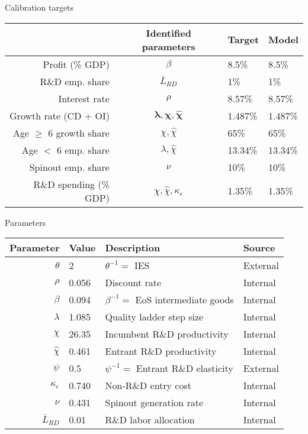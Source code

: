 \documentclass[english,usenames,dvipsnames]{beamer}
\begin{document}
\begin{frame}{Calibration targets}\label{calibration_targets}
\begin{table}[]
	\centering
	\small
	\begin{tabular}{rcll}
		\toprule \toprule
		& Identified parameters & Target & Model \tabularnewline
		\midrule
		Profit (\% GDP) & $\beta$ & 8.5\% & 8.5\% 
		\tabularnewline
		R\&D emp. share & $\bar{L}_{RD}$ & 1\% & 1\% 
		\tabularnewline
		Interest rate & $\rho$ & 8.57\% & 8.57\% 
		\tabularnewline
		Growth rate (CD + OI) & $\mathbf{\lambda, \chi, \hat{\chi}}$ & 1.487\% & 1.487\%
		\tabularnewline		
		Age $\ge$ 6 growth share & $\chi, \hat{\chi}$  & 65\% & 65\%
		\tabularnewline
		Age $<$ 6 emp. share  & $\lambda, \hat{\chi}$ & 13.34\% & 13.34\%
		\tabularnewline
		Spinout emp. share &$\nu$  & 10\% & 10\%
		\tabularnewline
		R\&D spending (\% GDP) & $\chi, \hat{\chi}, \kappa_e$  & 1.35\% & 1.35\%
		\tabularnewline
		\bottomrule
	\end{tabular}
\end{table}
\end{frame}


\begin{frame}{Parameters}\label{parameters}
\begin{table}[]
	\footnotesize
	\centering
	\label{calibration_parameters}
	\begin{tabular}{rlll}
		\toprule \toprule
		Parameter & Value & Description & Source \tabularnewline
		\midrule
		$\theta$ & 2 & $\theta^{-1} = $ IES & External
		\tabularnewline
		$\rho$ & 0.056 & Discount rate  & Internal \tabularnewline
		$\beta$ & 0.094 & $\beta^{-1} = $ EoS intermediate goods & Internal \tabularnewline 
		$\lambda$ & 1.085 & Quality ladder step size & Internal
		\tabularnewline
		$\chi$ & 26.35 & Incumbent R\&D productivity & Internal
		\tabularnewline
		$\hat{\chi}$ & 0.461 & Entrant R\&D productivity & Internal \tabularnewline 
		$\psi$ & 0.5 & $\psi^{-1} = $ Entrant R\&D elasticity & External \tabularnewline
		$\kappa_e$ & 0.740 & Non-R\&D entry cost & Internal \tabularnewline
		$\nu$ & 0.431 & Spinout generation rate  & Internal \tabularnewline
		$\bar{L}_{RD}$ & 0.01 & R\&D labor allocation  & Internal \tabularnewline
		\bottomrule
	\end{tabular}
\end{table}
\hyperlink{identification}{} 
\end{frame}
\end{document}
